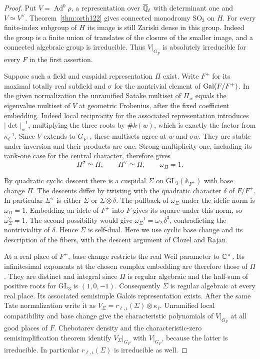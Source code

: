 \documentclass[a4paper,11pt]{article}
\theoremstyle{definition}
\theoremstyle{remark}
\numberwithin{equation}{section}
\begin{document}
\begin{proof}
Put \(V=\operatorname{Ad}^0\rho\), a representation over
\(\overline{\mathbb Q}_\ell\) with determinant one and \(V\simeq V^\vee\).
Theorem~\ref{thm:orth122} gives connected monodromy
\(\mathrm{SO}_3\) on \(H\). For every finite-index subgroup of \(H\)
its image is still Zariski dense in this group. Indeed the group is a
finite union of translates of the closure of the smaller image, and
a connected algebraic group is irreducible. Thus \(V|_{G_F}\) is
absolutely irreducible for every \(F\) in the first assertion.

Suppose such a field and cuspidal representation \(\Pi\) exist.
Write \(F^+\) for its maximal totally real subfield and \(\sigma\)
for the nontrivial element of \(\operatorname{Gal}(F/F^+)\). In the given
normalization the unramified Satake multiset of \(\Pi_w\) equals
the eigenvalue multiset of \(V\) at geometric Frobenius, after
the fixed coefficient embedding. Indeed local reciprocity for
the associated representation introduces
\(\lvert\det\rvert_w^{-1}\), multiplying the three roots by
\(\#k(w)\), which is exactly the factor from \(\kappa_\ell^{-1}\).
Since \(V\) extends to \(G_{F^+}\), these multisets agree at
\(w\) and \(\sigma w\). They are stable under inversion and
their products are one. Strong multiplicity one, including its
rank-one case for the central character, therefore gives
\[
          \Pi^\sigma\simeq\Pi,\qquad
          \Pi^\vee\simeq\Pi,\qquad \omega_\Pi=1.
\]

By quadratic cyclic descent there is a cuspidal \(\Sigma\) on
\(\mathrm{GL}_3(\mathbb A_{F^+})\) with base change \(\Pi\).
The descents differ by twisting with the quadratic character
\(\delta\) of \(F/F^+\). In particular \(\Sigma^\vee\) is either
\(\Sigma\) or \(\Sigma\otimes\delta\). The pullback of
\(\omega_\Sigma\) under the idelic norm is \(\omega_\Pi=1\).
Embedding an idele of \(F^+\) into \(F\) gives its square under
this norm, so \(\omega_\Sigma^2=1\). The second possibility would
give \(\omega_\Sigma^{-1}=\omega_\Sigma\delta^3\), contradicting
the nontriviality of \(\delta\). Hence \(\Sigma\) is self-dual.
Here we use cyclic base change and its description of the
fibers, with the descent argument of Clozel and
Rajan.~\cite{VII-V-I-ac123,VII-V-clozelrajan358}

At a real place of \(F^+\), base change restricts the real Weil
parameter to \(\mathbb C^\times\). Its infinitesimal exponents at the
chosen complex embedding are therefore those of \(\Pi\). They are
distinct and integral since \(\Pi\) is regular algebraic and the
half-sum of positive roots for \(\mathrm{GL}_3\) is \((1,0,-1)\).
Consequently \(\Sigma\) is regular algebraic at every real place.
Its associated semisimple Galois representation exists. After the
same Tate normalization write it as \(V_\Sigma=r_{\ell,\iota}(\Sigma)
\otimes\kappa_\ell\). Unramified local compatibility and base change
give the characteristic polynomials of \(V|_{G_F}\) at all good
places of \(F\). Chebotarev density and the characteristic-zero
semisimplification theorem identify \(V_\Sigma|_{G_F}\) with
\(V|_{G_F}\), because the latter is irreducible. In particular
\(r_{\ell,\iota}(\Sigma)\) is irreducible as well.


\end{proof}
\end{document}
